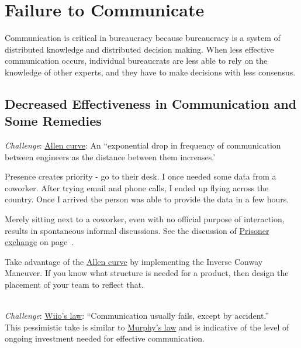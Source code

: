 \section{Failure to Communicate\label{sec:failure-to-comm}}

Communication is critical in bureaucracy because bureaucracy is a system of distributed knowledge and distributed decision making. When less effective communication occurs, individual bureaucrats are less able to rely on the knowledge of other experts, and they have to make decisions with less consensus. 

\subsection*{Decreased Effectiveness in Communication and Some Remedies}

\textit{Challenge}:  \href{https://en.wikipedia.org/wiki/Allen_curve}{Allen curve}: 
An ``exponential drop in frequency of communication between engineers as the distance between them increases.'

Presence creates priority - go to their desk. I once needed some data from a coworker. After trying email and phone calls, I ended up flying across the country. Once I arrived the person was able to provide the data in a few hours.

Merely sitting next to a coworker, even with no official purpose of interaction, results in spontaneous informal discussions. See the discussion of 
\hyperref[sec:prisoner-exchange]{Prisoner exchange} on 
page~\pageref{sec:prisoner-exchange}.

Take advantage of the \href{https://en.wikipedia.org/wiki/Allen_curve}{Allen curve} by implementing the Inverse Conway Maneuver. If you know what structure is needed for a product, then design the placement of your team to reflect that.

\ \\
\textit{Challenge}: \href{https://en.wikipedia.org/wiki/Wiio\%27s_laws}{Wiio's law}: 
``Communication usually fails, except by accident.''\\
This pessimistic take is similar to \href{https://en.wikipedia.org/wiki/Murphy\%27s_law}{Murphy's law} and is indicative of the level of ongoing investment needed for effective communication. 

